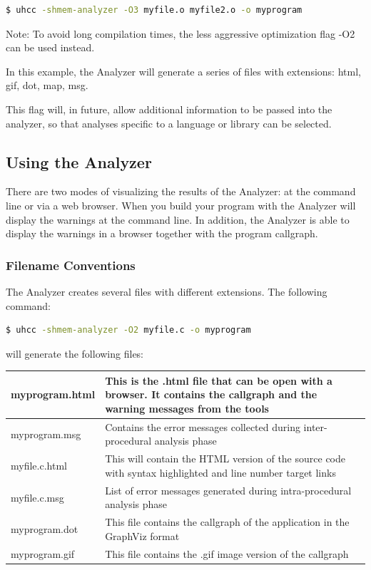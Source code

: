 \begin{lstlisting}[language=bash]
  $ uhcc -shmem-analyzer -O3 myfile.o myfile2.o -o myprogram 
\end{lstlisting}

Note: To avoid long compilation times, the less aggressive
optimization flag -O2 can be used instead.

In this example, the \openshmem Analyzer will generate a
series of files with extensions: html, gif, dot, map, msg.

This flag will, in future, allow additional information to be passed
into the analyzer, so that analyses specific to a language or library
can be selected.

\subsection{Using the \openshmem Analyzer}

There are two modes of visualizing the results of the \openshmem
Analyzer: at the command line or via a web browser. When you build
your program with the \openshmem Analyzer will display the warnings at
the command line. In addition, the \openshmem Analyzer is able to
display the warnings in a browser together with the program callgraph.

\subsubsection{Filename Conventions}

The \openshmem Analyzer creates several files with different extensions. 
The following command:

\begin{lstlisting}[language=bash]
  $ uhcc -shmem-analyzer -O2 myfile.c -o myprogram
\end{lstlisting}

will generate the following files:

\vspace{0.1in}

\begin{center}
  \begin{tabular}{| l | p{10cm} |}
    \hline
    myprogram.html & This is the .html file that can be open with a browser. It contains the callgraph and the warning messages from the tools \\
    \hline
    myprogram.msg & Contains the error messages collected during inter-procedural analysis phase \\
    \hline
    myfile.c.html & This will contain the HTML version of the source code with syntax highlighted and line number target links \\
    \hline
    myfile.c.msg & List of error messages generated during intra-procedural analysis phase \\
    \hline
    myprogram.dot & This file contains the callgraph of the application in the GraphViz format \\
    \hline
    myprogram.gif & This file contains the .gif image version of the callgraph \\
    \hline
  \end{tabular}
\end{center}

